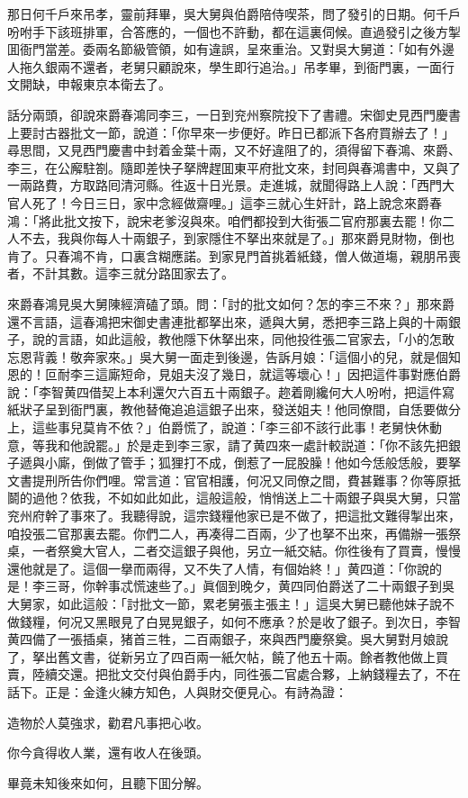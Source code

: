 那日何千戶來吊孝，靈前拜畢，吳大舅與伯爵陪侍喫茶，問了發引的日期。何千戶吩咐手下該班排軍，合答應的，一個也不許動，都在這裏伺候。直過發引之後方掣囬衙門當差。委兩名節級管領，如有違誤，呈來重治。又對吳大舅道：「如有外邊人拖久銀兩不還者，老舅只顧說來，學生即行追治。」吊孝畢，到衙門裏，一面行文開缺，申報東京本衛去了。

話分兩頭，卻說來爵春鴻同李三，一日到兖州察院投下了書禮。宋御史見西門慶書上要討古器批文一節，說道：「你早來一步便好。昨日已都派下各府買辦去了！」尋思間，又見西門慶書中封着金葉十兩，又不好違阻了的，須得留下春鴻、來爵、李三，在公廨駐劄。隨即差快子拏牌趕囬東平府批文來，封囘與春鴻書中，又與了一兩路費，方取路囘清河縣。徃返十日光景。走進城，就聞得路上人說：「西門大官人死了！今日三日，家中念經做齋哩。」這李三就心生奸計，路上說念來爵春鴻：「將此批文按下，說宋老爹沒與來。咱們都投到大街張二官府那裏去罷！你二人不去，我與你每人十兩銀子，到家隱住不拏出來就是了。」那來爵見財物，倒也肯了。只春鴻不肯，口裏含糊應諾。到家見門首挑着紙錢，僧人做道塲，親朋吊喪者，不計其數。這李三就分路囬家去了。

來爵春鴻見吳大舅陳經濟磕了頭。問：「討的批文如何？怎的李三不來？」那來爵還不言語，這春鴻把宋御史書連批都拏出來，遞與大舅，悉把李三路上與的十兩銀子，說的言語，如此這般，教他隱下休拏出來，同他投徃張二官家去，「小的怎敢忘恩背義！敬奔家來。」吳大舅一面走到後邊，告訴月娘：「這個小的兒，就是個知恩的！叵耐李三這廝短命，見姐夫沒了幾日，就這等壞心！」因把這件事對應伯爵說：「李智黄四借契上本利還欠六百五十兩銀子。趂着剛纔何大人吩咐，把這件寫紙狀子呈到衙門裏，教他替俺追追這銀子出來，發送姐夫！他同僚間，自恁要做分上，這些事兒莫肯不依？」伯爵慌了，說道：「李三卻不該行此事！老舅快休動意，等我和他說罷。」於是走到李三家，請了黄四來一處計較説道：「你不該先把銀子遞與小廝，倒做了管手；狐狸打不成，倒惹了一屁股臊！他如今恁般恁般，要拏文書提刑所告你們哩。常言道：官官相護，何况又同僚之間，費甚難事？你等原抵鬬的過他？依我，不如如此如此，這般這般，悄悄送上二十兩銀子與吳大舅，只當兖州府幹了事來了。我聽得說，這宗錢糧他家已是不做了，把這批文難得掣出來，咱投張二官那裏去罷。你們二人，再凑得二百兩，少了也拏不出來，再備辦一張祭桌，一者祭奠大官人，二者交這銀子與他，另立一紙交結。你徃後有了買賣，慢慢還他就是了。這個一擧而兩得，又不失了人情，有個始終！」黄四道：「你說的是！李三哥，你幹事忒慌速些了。」眞個到晚夕，黄四同伯爵送了二十兩銀子到吳大舅家，如此這般：「討批文一節，累老舅張主張主！」這吳大舅已聽他妹子說不做錢糧，何况又黑眼見了白晃晃銀子，如何不應承？於是收了銀子。到次日，李智黄四備了一張插桌，猪首三牲，二百兩銀子，來與西門慶祭奠。吳大舅對月娘說了，拏出舊文書，従新另立了四百兩一紙欠帖，饒了他五十兩。餘者教他做上買賣，陸續交還。把批文交付與伯爵手内，同徃張二官處合夥，上納錢糧去了，不在話下。正是：金逢火練方知色，人與財交便見心。有詩為證：

\begin{myquote}
造物於人莫強求，勸君凡事把心收。

你今貪得收人業，還有收人在後頭。
\end{myquote}

畢竟未知後來如何，且聽下囬分解。


